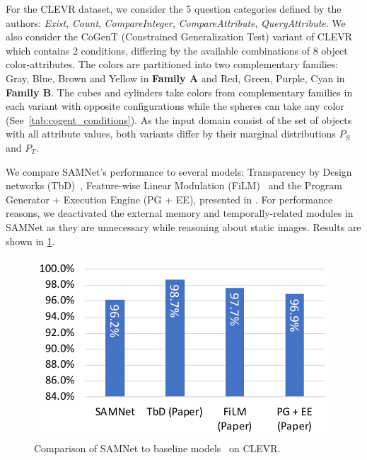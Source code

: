 For the CLEVR dataset, we consider the 5 question categories defined by the authors: \textit{Exist}, \textit{Count}, \textit{CompareInteger}, \textit{CompareAttribute}, \textit{QueryAttribute}. We also consider the CoGenT (Constrained Generalization Test) variant of CLEVR which contains 2 conditions, differing by the available combinations of 8 object color-attributes. The colors are partitioned into two complementary families:
Gray, Blue, Brown and Yellow in \textbf{Family A} and Red, Green, Purple, Cyan in \textbf{Family B}.
The cubes and cylinders take colors from complementary families in each variant with opposite configurations while the spheres can take any color (See~\cref{tab:cogent_conditions}).
As the input domain consist of the set of objects with all attribute values, both variants differ by their marginal distributions $P_S$ and $P_T$.

We compare SAMNet's performance to several models: Transparency by Design networks (TbD)~\cite{mascharka2018transparency}, Feature-wise Linear Modulation (FiLM)~\cite{perez2018film} and the Program Generator + Execution Engine (PG + EE), presented in \cite{johnson2017inferring}. For performance reasons, we deactivated the external memory and temporally-related modules in SAMNet as they are unnecessary while reasoning about static images.
Results are shown in \cref{fig:clevr-baseline-compare}. 

\begin{figure}[!t]
	\centering
	\includegraphics[width=\columnwidth]{../results/CLEVR_baselines_comparison.pdf}
	\caption{Comparison of SAMNet to baseline models~\cite{mascharka2018transparency, perez2018film, johnson2017inferring} on CLEVR.}
	\label{fig:clevr-baseline-compare}
\end{figure}

